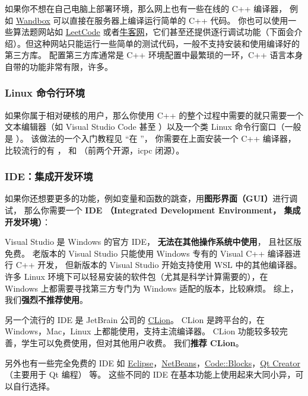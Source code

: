 如果你不想在自己电脑上部署环境，那么网上也有一些在线的 C++ 编译器， 例如 \href{https://wandbox.org/}{Wandbox} 可以直接在服务器上编译运行简单的 C++ 代码。 你也可以使用一些算法题网站如 \href{https://leetcode.com/}{LeetCode} 或者\href{https://www.nowcoder.com/}{牛客网}，它们甚至还提供逐行调试功能（下面会介绍）。但这种网站只能运行一些简单的测试代码，一般不支持安装和使用编译好的第三方库。 配置第三方库通常是 C++ 环境配置中最繁琐的一环，C++ 语言本身自带的功能非常有限，许多。

\subsubsection{Linux 命令行环境}
如果你属于相对硬核的用户，那么你使用 C++ 的整个过程中需要的就只需要一个文本编辑器（如 Visual Studio Code 甚至 ）以及一个类 Linux 命令行窗口（一般是 ）。 该做法的一个入门教程见 “在 ”， 你需要在上面安装一个 C++ 编译器， 比较流行的有 ，  和 （前两个开源，icpc 闭源）。

\subsubsection{IDE：集成开发环境}
如果你还想要更多的功能，例如变量和函数的跳查，用\textbf{图形界面（GUI）}进行调试， 那么你需要一个 \textbf{IDE （Integrated Development Environment， 集成开发环境）}：

Visual Studio 是 Windows 的官方 IDE， \textbf{无法在其他操作系统中使用}， 且社区版免费。 老版本的 Visual Studio 只能使用 Windows 专有的 Visual C++ 编译器进行 C++ 开发， 但新版本的 Visual Studio 开始支持使用 WSL 中的其他编译器。 许多 Linux 环境下可以轻易安装的软件包（尤其是科学计算需要的），在 Windows 上都需要寻找第三方专门为 Windows 适配的版本，比较麻烦。 综上，我们\textbf{强烈不推荐使用}。

另一个流行的 IDE 是 JetBrain 公司的 \href{https://www.jetbrains.com/clion/}{CLion}。 CLion 是跨平台的，在 Windows，Mac，Linux 上都能使用，支持主流编译器。 CLion 功能较多较完善，学生可以免费使用，但对其他用户收费。 我们\textbf{推荐 CLion}。

另外也有一些完全免费的 IDE 如 \href{https://eclipseide.org/}{Eclipse}，\href{https://netbeans.apache.org/front/main/index.html}{NetBeans}，\href{https://www.codeblocks.org/}{Code::Blocks}，\href{https://www.qt.io/product/development-tools}{Qt Creator} （主要用于 Qt 编程） 等。 这些不同的 IDE 在基本功能上使用起来大同小异，可以自行选择。

